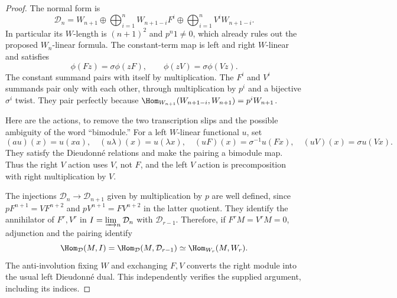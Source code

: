 \begin{proof}
The normal form is
\[
 \mathcal D_n=W_{n+1}\oplus
 \bigoplus_{i=1}^nW_{n+1-i}F^i\oplus
 \bigoplus_{i=1}^nV^iW_{n+1-i}.
\]
In particular its $W$-length is $(n+1)^2$ and $p^n1\ne0$, which already rules out the proposed $W_n$-linear formula.  The constant-term map is left and right $W$-linear and satisfies
\[
 \phi(Fz)=\sigma\phi(zF),\qquad
 \phi(zV)=\sigma\phi(Vz).
\]
The constant summand pairs with itself by multiplication.  The $F^i$ and $V^i$ summands pair only with each other, through multiplication by $p^i$ and a bijective $\sigma^i$ twist.  They pair perfectly because
$\Hom_{W_{n+1}}(W_{n+1-i},W_{n+1})=p^iW_{n+1}$.

Here are the actions, to remove the two transcription slips and the possible ambiguity of the word ``bimodule.''  For a left $W$-linear functional $u$, set
\[
 (a u)(x)=u(xa),\quad
 (u\lambda)(x)=u(\lambda x),\quad
 (uF)(x)=\sigma^{-1}u(Fx),\quad
 (uV)(x)=\sigma u(Vx).
\]
They satisfy the Dieudonn\'e relations and make the pairing a bimodule map.  Thus the right $V$ action uses $V$, not $F$, and the left $V$ action is precomposition with right multiplication by $V$.

The injections $\mathcal D_n\to\mathcal D_{n+1}$ given by multiplication by $p$ are well defined, since $pF^{n+1}=VF^{n+2}$ and $pV^{n+1}=FV^{n+2}$ in the latter quotient.  They identify the annihilator of $F^r,V^r$ in $I=\varinjlim_n\mathcal D_n$ with $\mathcal D_{r-1}$.  Therefore, if $F^rM=V^rM=0$, adjunction and the pairing identify
\[
 \Hom_{\mathcal D}(M,I)
 =\Hom_{\mathcal D}(M,\mathcal D_{r-1})
 \simeq\Hom_{W_r}(M,W_r).
\]
The anti-involution fixing $W$ and exchanging $F,V$ converts the right module into the usual left Dieudonn\'e dual.  This independently verifies the supplied argument, including its indices.
\end{proof}

